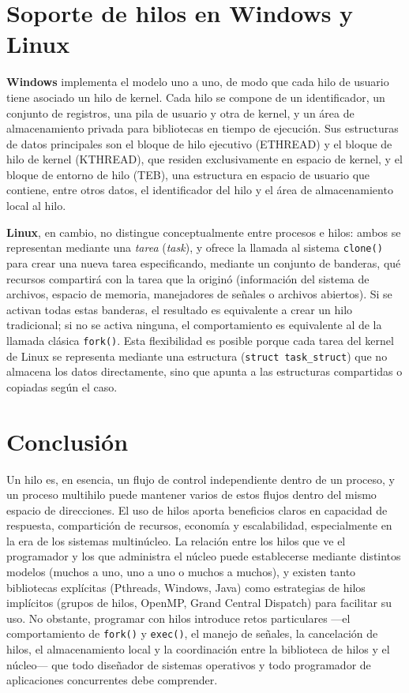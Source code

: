 \documentclass[12pt,letterpaper]{article}
\begin{document}
\section{Soporte de hilos en Windows y Linux}

\textbf{Windows} implementa el modelo uno a uno, de modo que cada hilo de usuario tiene asociado un hilo de kernel. Cada hilo se compone de un identificador, un conjunto de registros, una pila de usuario y otra de kernel, y un área de almacenamiento privada para bibliotecas en tiempo de ejecución. Sus estructuras de datos principales son el bloque de hilo ejecutivo (ETHREAD) y el bloque de hilo de kernel (KTHREAD), que residen exclusivamente en espacio de kernel, y el bloque de entorno de hilo (TEB), una estructura en espacio de usuario que contiene, entre otros datos, el identificador del hilo y el área de almacenamiento local al hilo.

\textbf{Linux}, en cambio, no distingue conceptualmente entre procesos e hilos: ambos se representan mediante una \textit{tarea} (\textit{task}), y ofrece la llamada al sistema \texttt{clone()} para crear una nueva tarea especificando, mediante un conjunto de banderas, qué recursos compartirá con la tarea que la originó (información del sistema de archivos, espacio de memoria, manejadores de señales o archivos abiertos). Si se activan todas estas banderas, el resultado es equivalente a crear un hilo tradicional; si no se activa ninguna, el comportamiento es equivalente al de la llamada clásica \texttt{fork()}. Esta flexibilidad es posible porque cada tarea del kernel de Linux se representa mediante una estructura (\texttt{struct task\_struct}) que no almacena los datos directamente, sino que apunta a las estructuras compartidas o copiadas según el caso.

\section{Conclusión}

Un hilo es, en esencia, un flujo de control independiente dentro de un proceso, y un proceso multihilo puede mantener varios de estos flujos dentro del mismo espacio de direcciones. El uso de hilos aporta beneficios claros en capacidad de respuesta, compartición de recursos, economía y escalabilidad, especialmente en la era de los sistemas multinúcleo. La relación entre los hilos que ve el programador y los que administra el núcleo puede establecerse mediante distintos modelos (muchos a uno, uno a uno o muchos a muchos), y existen tanto bibliotecas explícitas (Pthreads, Windows, Java) como estrategias de hilos implícitos (grupos de hilos, OpenMP, Grand Central Dispatch) para facilitar su uso. No obstante, programar con hilos introduce retos particulares —el comportamiento de \texttt{fork()} y \texttt{exec()}, el manejo de señales, la cancelación de hilos, el almacenamiento local y la coordinación entre la biblioteca de hilos y el núcleo— que todo diseñador de sistemas operativos y todo programador de aplicaciones concurrentes debe comprender.
\end{document}
